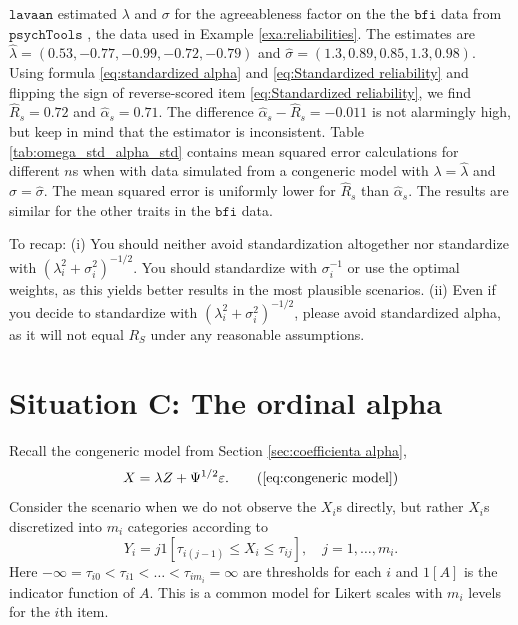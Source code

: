 \documentclass[twoside]{article}
\begin{document}
\begin{example}

$\mathtt{lavaan}$ estimated $\lambda$ and $\sigma$ for the agreeableness factor on the the $\texttt{bfi}$ data from $\texttt{psychTools}$ \citep{Revelle2019-te}, the data used in Example \ref{exa:reliabilities}. The estimates are $\hat{\lambda} = (0.53, -0.77, -0.99, -0.72, -0.79)$ and $\hat{\sigma} = (1.3, 0.89, 0.85, 1.3, 0.98)$. Using formula \eqref{eq:standardized alpha} and \eqref{eq:Standardized reliability} and flipping the sign of reverse-scored item \eqref{eq:Standardized reliability}, we find $\hat{ R}_s = 0.72$ and $\hat{\alpha}_s = 0.71$. The difference $\hat{\alpha}_s - \hat{ R}_s = -0.011$ is not alarmingly high, but keep in mind that the estimator is inconsistent. Table \ref{tab:omega_std_alpha_std} contains mean squared error calculations for different $n$s when with data simulated from a congeneric model with $\lambda=\hat{\lambda}$ and $\sigma = \hat{\sigma}$. The mean squared error is uniformly lower for $\hat{ R}_s$ than $\hat{\alpha}_s$. The results are similar for the other traits in the $\texttt{bfi}$ data.
\end{example}

To recap: (i) You should neither avoid standardization altogether nor standardize with $(\lambda_{i}^{2}+\sigma_{i}^{2})^{-1/2}$. You should standardize with $\sigma_i^{-1}$ or use the optimal weights, as this yields better results in the most plausible scenarios. (ii) Even if you decide to standardize with $(\lambda_{i}^{2}+\sigma_{i}^{2})^{-1/2}$, please avoid standardized alpha, as it will not equal $ R_S$ under any reasonable assumptions.

\section{Situation C: The ordinal alpha \label{sec:Ordinal alpha}}

Recall the congeneric model from Section \ref{sec:coefficienta alpha},
\begin{equation}
X=\lambda Z+\Psi^{1/2}\varepsilon.    \tag{\ref{eq:congeneric model}}
\end{equation}
Consider the scenario when we do not observe the $X_{i}$s directly,
but rather $X_{i}$s discretized into $m_{i}$ categories according
to
\begin{equation}
Y_{i}=j1[\tau_{i(j-1)}\leq X_{i}\leq\tau_{ij}],\quad j = 1, \ldots,m_i. \label{eq:discretization model}
\end{equation}
Here $-\infty=\tau_{i0}<\tau_{i1}<\ldots<\tau_{im_{i}}=\infty$
are thresholds for each $i$ and $1[A]$ is the indicator function of $A$.
This is a common model for Likert scales with $m_{i}$ levels for
the $i$th item. 
\end{document}
